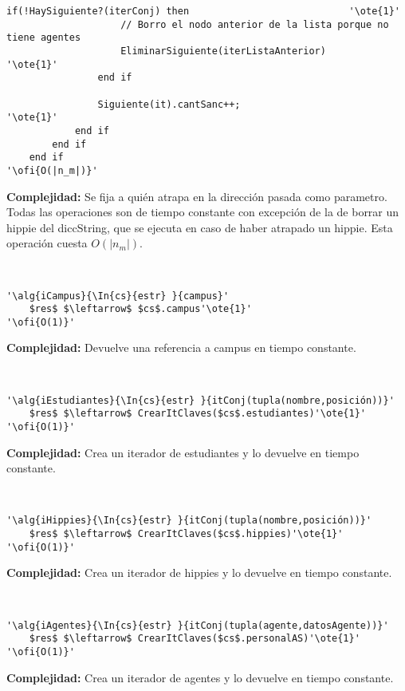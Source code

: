 \begin{lstlisting}[mathescape]
	   			if(!HaySiguiente?(iterConj) then							'\ote{1}'
	   				// Borro el nodo anterior de la lista porque no tiene agentes
	   				EliminarSiguiente(iterListaAnterior)					'\ote{1}'
	   			end if

	   			Siguiente(it).cantSanc++;											'\ote{1}'
	   		end if
	   	end if
	end if
'\ofi{O(|n_m|)}'
\end{lstlisting}

\textbf{Complejidad:} Se fija a quién atrapa en la dirección pasada como parametro. Todas las operaciones son de tiempo constante con excepción de la de borrar un hippie del diccString, que se ejecuta en caso de haber atrapado un hippie. Esta operación cuesta $O(|n_m|)$.

~


\begin{lstlisting}[mathescape]
'\alg{iCampus}{\In{cs}{estr} }{campus}'
	$res$ $\leftarrow$ $cs$.campus'\ote{1}'
'\ofi{O(1)}'
\end{lstlisting}

\textbf{Complejidad:} Devuelve una referencia a campus en tiempo constante.

~


\begin{lstlisting}[mathescape]
'\alg{iEstudiantes}{\In{cs}{estr} }{itConj(tupla(nombre,posición))}'
	$res$ $\leftarrow$ CrearItClaves($cs$.estudiantes)'\ote{1}'
'\ofi{O(1)}'
\end{lstlisting}

\textbf{Complejidad:} Crea un iterador de estudiantes y lo devuelve en tiempo constante.

~


\begin{lstlisting}[mathescape]
'\alg{iHippies}{\In{cs}{estr} }{itConj(tupla(nombre,posición))}'
	$res$ $\leftarrow$ CrearItClaves($cs$.hippies)'\ote{1}'
'\ofi{O(1)}'
\end{lstlisting}

\textbf{Complejidad:} Crea un iterador de hippies y lo devuelve en tiempo constante.

~


\begin{lstlisting}[mathescape]
'\alg{iAgentes}{\In{cs}{estr} }{itConj(tupla(agente,datosAgente))}'
	$res$ $\leftarrow$ CrearItClaves($cs$.personalAS)'\ote{1}'
'\ofi{O(1)}'
\end{lstlisting}

\textbf{Complejidad:} Crea un iterador de agentes y lo devuelve en tiempo constante.

